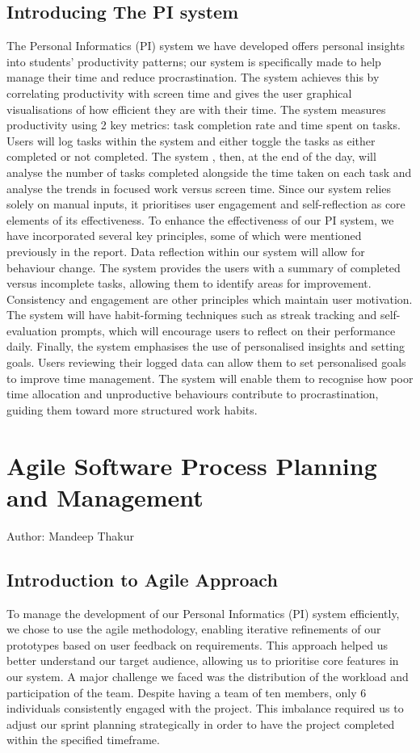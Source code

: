 \documentclass[12pt,a4paper]{article}
\begin{document}
\subsection{Introducing The PI system}
The Personal Informatics (PI) system we have developed offers personal insights into students' productivity patterns; our system is specifically made to help manage their time and reduce procrastination. The system achieves this by correlating productivity with screen time and gives the user graphical visualisations of how efficient they are with their time. The system measures productivity using 2 key metrics: task completion rate and time spent on tasks. Users will log tasks within the system and either toggle the tasks as either completed or not completed. The system , then, at the end of the day, will analyse the number of tasks completed alongside the time taken on each task and analyse the trends in focused work versus screen time. Since our system relies solely on manual inputs, it prioritises user engagement and self-reflection as core elements of its effectiveness. To enhance the effectiveness of our PI system, we have incorporated several key principles, some of which were mentioned previously in the report. Data reflection within our system will allow for behaviour change. The system provides the users with a summary of completed versus incomplete tasks, allowing them to identify areas for improvement. Consistency and engagement are other principles which maintain user motivation. The system will have habit-forming techniques such as streak tracking and self-evaluation prompts, which will encourage users to reflect on their performance daily. Finally, the system emphasises the use of personalised insights and setting goals. Users reviewing their logged data can allow them to set personalised goals to improve time management. The system will enable them to recognise how poor time allocation and unproductive behaviours contribute to procrastination, guiding them toward more structured work habits.



\label{sec:intro}

\newpage
\section{Agile Software Process Planning and Management}
Author: Mandeep Thakur
\subsection{Introduction to Agile Approach}
To manage the development of our Personal Informatics (PI) system efficiently, we chose to use the agile methodology, enabling iterative refinements of our prototypes based on user feedback on requirements. This approach helped us better understand our target audience, allowing us to prioritise core features in our system. A major challenge we faced was the distribution of the workload and participation of the team. Despite having a team of ten members, only 6 individuals consistently engaged with the project. This imbalance required us to adjust our sprint planning strategically in order to have the project completed within the specified timeframe.
\end{document}
